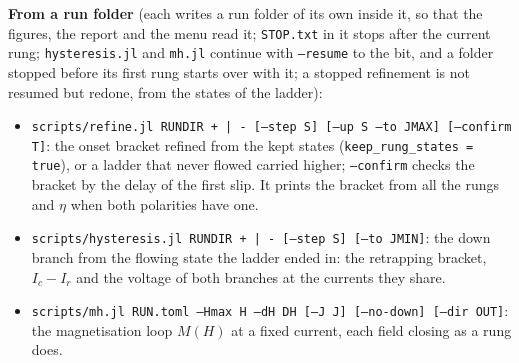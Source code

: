 \documentclass[11pt,a4paper]{article}
\newcommand{\code}[1]{\texttt{#1}}
\begin{document}
\textbf{From a run folder} (each writes a run folder of its own inside it, so that the figures, the report and the menu read it;
\code{STOP.txt} in it stops after the current rung; \code{hysteresis.jl} and \code{mh.jl} continue with \code{--resume} to the bit,
and a folder stopped before its first rung starts over with it; a stopped refinement is not resumed but redone, from the states
of the ladder):
\begin{itemize}
\item \code{scripts/refine.jl RUNDIR + | - [--step S] [--up S --to JMAX] [--confirm T]}: the onset bracket refined from the kept states
  (\code{keep\_rung\_states = true}), or a ladder that never flowed carried higher; \code{--confirm} checks the bracket by the
  delay of the first slip. It prints the bracket from all the rungs and $\eta$ when both polarities have one.
\item \code{scripts/hysteresis.jl RUNDIR + | - [--step S] [--to JMIN]}: the down branch from the flowing state the ladder ended in:
  the retrapping bracket, $I_c - I_r$ and the voltage of both branches at the currents they share.
\item \code{scripts/mh.jl RUN.toml --Hmax H --dH DH [--J J] [--no-down] [--dir OUT]}: the magnetisation loop $M(H)$ at a fixed
  current, each field closing as a rung does.
\end{itemize}
\end{document}
